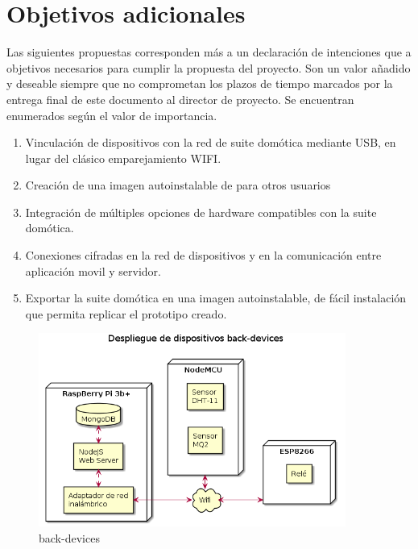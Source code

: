 \section{Objetivos adicionales}
\label{ch:Capitulo3.4}

Las siguientes propuestas corresponden más a un declaración de intenciones que a objetivos necesarios para cumplir la propuesta del proyecto. Son un valor añadido y deseable siempre que no comprometan los plazos de tiempo marcados por la entrega final de este documento al director de proyecto. Se encuentran enumerados según el valor de importancia.

\begin{enumerate}

  \item Vinculación de dispositivos con la red de suite domótica mediante USB, en lugar del clásico emparejamiento WIFI.

  \item Creación de una imagen autoinstalable de para otros usuarios

  \item Integración de múltiples opciones de hardware compatibles con la suite domótica.

  \item Conexiones cifradas en la red de dispositivos y en la comunicación entre aplicación movil y servidor.

  \item Exportar la suite domótica en una imagen autoinstalable, de fácil instalación que permita replicar el prototipo creado.

\end{enumerate}

\begin{figure}[hbt!]
\centering
\includegraphics[height=2.5in]{figures/diagrams/physical-devices/back-devices.png}
\caption[back-devices]{back-devices\footnotemark}
\end{figure}
